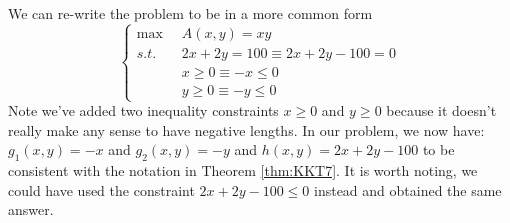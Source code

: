We can re-write the problem to be in a more common form
\begin{equation}
\left\{
\begin{aligned}
\max \;\; & A(x,y) = x y \\
s.t. \;\; & 2x + 2y = 100 \equiv 2x + 2y - 100 = 0\\
& x \geq 0 \equiv -x \leq 0\\
& y \geq 0 \equiv -y \leq 0 
\end{aligned}\right.
\label{eqn:GoatMax}
\end{equation}
Note we've added two inequality constraints $x \geq 0$ and $y \geq 0$ because it doesn't really make any sense to have negative lengths. In our problem, we now have: $g_1(x,y) = -x$ and $g_2(x,y) = -y$ and $h(x,y) = 2x+2y-100$ to be consistent with the notation in Theorem \ref{thm:KKT7}. It is worth noting, we could have used the constraint $2x + 2y - 100 \leq 0$ instead and obtained the same answer.

